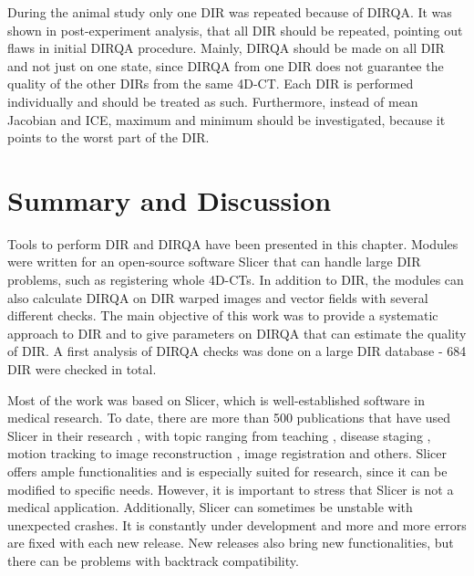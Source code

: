 \documentclass[type=dr, dr=rernat, accentcolor=tud7b,colorbacktitle, bigchapter, openright, twoside, 12pt ]{tudthesis}
\begin{document}
During the animal study only one DIR was repeated because of DIRQA. It was shown in post-experiment analysis, that all DIR should be repeated, pointing out flaws in initial DIRQA procedure.
Mainly, DIRQA should be made on all DIR and not just on one state, since DIRQA from one DIR does not guarantee the quality of the other DIRs from the same 4D-CT. 
Each DIR is performed individually and should be treated as such. Furthermore, instead of mean Jacobian and ICE, maximum and minimum should be investigated, 
because it points to the worst part of the DIR.





\section{Summary and Discussion}
\label{Summary}

Tools to perform DIR and DIRQA have been presented in this chapter. Modules were written for an open-source software Slicer that can handle large DIR problems, such as registering whole 4D-CTs. 
In addition to DIR, the modules can also calculate DIRQA on DIR warped images and vector fields with several different checks.
The main objective of this work was to provide a systematic approach to DIR and to give parameters on DIRQA that can estimate the quality of DIR. A first analysis of DIRQA checks was done on a large DIR database - 684 DIR were checked in total.

Most of the work was based on Slicer, which is well-established software in medical research. To date, there are more than 500 publications that have used Slicer in their research \cite{SlicerCitation}, with topic ranging from 
teaching \cite{Pujol2016}, disease staging \cite{Liu2015, Liu2016b}, motion tracking \cite{Behringer2015} to image reconstruction \cite{Meyer2015}, image registration \cite{Li2015, Fedorov2015, Li2015b}
and others. Slicer offers ample functionalities and is especially suited for research, since it can be modified to specific needs. However, it is important to stress that Slicer 
is not a medical application. Additionally, Slicer can sometimes be unstable with unexpected crashes. It is constantly under development and more and more errors
are fixed with each new release. New releases also bring new functionalities, but there can be problems with backtrack compatibility. 
\end{document}
